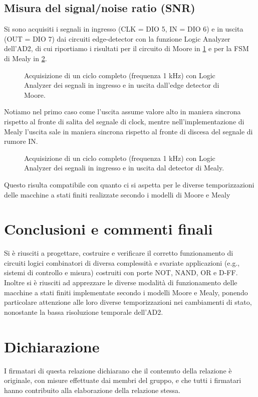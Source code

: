 \documentclass[10pt, a4paper, italian]{article}
\begin{document}
\subsection{Misura del signal/noise ratio (SNR)}
Si sono acquisiti i segnali in ingresso (CLK = DIO 5, IN = DIO 6) e in uscita
(OUT = DIO 7) dai circuiti edge-detector con la funzione Logic Analyzer
dell'AD2, di cui riportiamo i risultati per il circuito di Moore in
\cref{fig: edgeMoore} e per la FSM di Mealy in \cref{fig: edgeMealy}.
\begin{figure}[htbp]
    \centering
    \caption{Acquisizione di un ciclo completo (frequenza 1 kHz) con Logic
    Analyzer dei segnali in ingresso e in uscita dall'edge detector di Moore.
    \label{fig: edgeMoore}}
\end{figure}

Notiamo nel primo caso come l'uscita assume valore alto in maniera sincrona
rispetto al fronte di salita del segnale di clock, mentre nell'implementazione
di Mealy l'uscita sale in maniera sincrona rispetto al fronte di discesa del
segnale di rumore IN.
\begin{figure}[htbp]
    \centering
    \caption{Acquisizione di un ciclo completo (frequenza 1 kHz) con Logic
    Analyzer dei segnali in ingresso e in uscita dal detector di Mealy.
    \label{fig: edgeMealy}}
\end{figure}

Questo risulta compatibile con quanto ci si aspetta per le diverse
temporizzazioni delle macchine a stati finiti realizzate secondo i modelli di
Moore e Mealy

\section*{Conclusioni e commenti finali}
Si è riusciti a progettare, costruire e verificare il corretto funzionamento
di circuiti logici combinatori di diversa complessità e svariate applicazioni
(e.g., sistemi di controllo e misura) costruiti con porte NOT, NAND, OR e D-FF.
Inoltre si è riusciti ad apprezzare le diverse modalità di funzionamento delle
macchine a stati finiti implementate secondo i modelli Moore e Mealy, ponendo
particolare attenzione alle loro diverse temporizzazioni nei cambiamenti di
stato, nonostante la bassa risoluzione temporale dell'AD2.

\section*{Dichiarazione}
I firmatari di questa relazione dichiarano che il contenuto della relazione \`e
originale, con misure effettuate dai membri del gruppo, e che tutti i firmatari
hanno contribuito alla elaborazione della relazione stessa.
\end{document}
